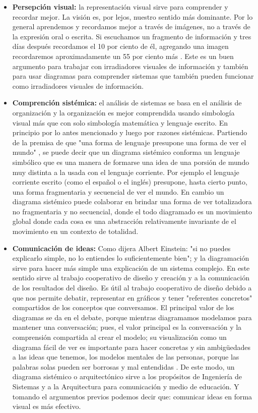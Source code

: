 \begin{itemize}

\item \textbf{Persepción visual:} la representación visual sirve para comprender y recordar mejor. La visión es, por lejos, nuestro sentido más dominante. Por lo general aprendemos y recordamos mejor a través de imágenes, no a través de la expresión oral o escrita. Si escuchamos un fragmento de información y tres días después recordamos el 10 por ciento de él, agregando una imagen recordaremos aproximadamente un 55 por ciento más \cite{John-Medina-2008}. Este es un buen argumento para trabajar con irradiadores visuales de información y también para usar diagramas para comprender sistemas que también pueden funcionar como irradiadores visuales de información.

\item \textbf{Comprención sistémica:} el análisis de sistemas se basa en el análisis de organización y la organización es mejor comprendida usando simbología visual más que con solo simbología matemática y lenguaje escrito. En principio por lo antes mencionado y luego por razones sistémicas. Partiendo de la premisa de que "una forma de lenguaje presupone una forma de ver el mundo" \cite{David-Bohm-2008}, se puede decir que un diagrama sistémico conforma un lenguaje simbólico que es una manera de formarse una idea de una porsión de mundo muy distinta a la usada con el lenguaje corriente. Por ejemplo el lenguaje corriente escrito (como el español o el inglés) presupone, hasta cierto punto, una forma fragmentaria y secuencial de ver el mundo. En cambio un diagrama sistémico puede colaborar en brindar una forma de ver totalizadora no fragmentaria y no secuencial, donde el todo diagramado es un movimiento global donde cada cosa es una abstracción relativamente invariante de el movimiento en un contexto de totalidad.

\item \textbf{Comunicación de ideas:} Como dijera Albert Einstein: "si no puedes explicarlo simple, no lo entiendes lo suficientemente bien"; y la diagramación sirve para hacer más simple una explicación de un sistema complejo. En este sentido sirve al trabajo cooperativo de diseño y creación y a la comunicación de los resultados del diseño. Es útil al trabajo cooperativo de diseño debido a que nos permite debatir, representar en gráficos y tener "referentes concretos" compartidos de los conceptos que conversamos. El principal valor de los diagramas se da en el debate, porque mientras diagramamos modelamos para mantener una conversación; pues, el valor principal es la conversación y la comprensión compartida al crear el modelo; su visualización como un diagrama fácil de ver es importante para hacer concretas y sin ambigüedades a las ideas que tenemos, los modelos mentales de las personas, porque las palabras solas pueden ser borrosas y mal entendidas \cite{Larman-Vodde-2008}. De este modo, un diagrama sistémico o arquitectónico sirve a los propósitos de Ingeniería de Sistemas y a la Arquitectura para comunicación y medio de educación. Y tomando el argumentos previos podemos decir que: comunicar ideas en forma visual es más efectivo.


\end{itemize}
